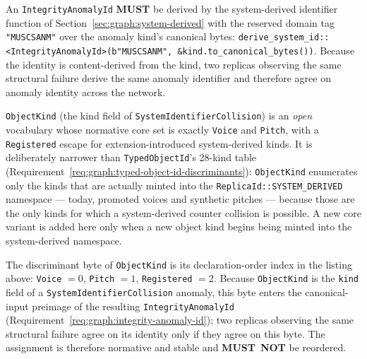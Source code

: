 \documentclass[11pt,letterpaper]{report}
\newcounter{requirement}[chapter]
\newcommand{\MUST}{\textbf{MUST}}
\newcommand{\MUSTNOT}{\textbf{MUST}\nobreak\ \textbf{NOT}}
\begin{document}
\begin{requirement}
  \label{req:graph:integrity-anomaly-id}
  An \texttt{IntegrityAnomalyId} \MUST{} be derived by the
  system-derived identifier function of
  Section~\ref{sec:graph:system-derived} with the reserved domain tag
  \texttt{"MUSCSANM"} over the anomaly kind's canonical bytes:
  \texttt{derive\_system\_id::<IntegrityAnomalyId>(b"MUSCSANM",
  \&kind.to\_canonical\_bytes())}. Because the identity is content-derived
  from the kind, two replicas observing the same structural failure
  derive the same anomaly identifier and therefore agree on anomaly
  identity across the network.
\end{requirement}

\begin{requirement}
  \label{req:graph:object-kind-vocab}
  \texttt{ObjectKind} (the kind field of
  \texttt{SystemIdentifierCollision}) is an \emph{open} vocabulary
  whose normative core set is exactly \texttt{Voice} and
  \texttt{Pitch}, with a \texttt{Registered} escape for
  extension-introduced system-derived kinds. It is deliberately
  narrower than \texttt{TypedObjectId}'s 28-kind table
  (Requirement~\ref{req:graph:typed-object-id-discriminants}):
  \texttt{ObjectKind} enumerates only the kinds that are actually
  minted into the \texttt{ReplicaId::SYSTEM\_DERIVED} namespace ---
  today, promoted voices and synthetic pitches --- because those are
  the only kinds for which a system-derived counter collision is
  possible. A new core variant is added here only when a new object
  kind begins being minted into the system-derived namespace.

  The discriminant byte of \texttt{ObjectKind} is its declaration-order
  index in the listing above: \texttt{Voice} $= 0$, \texttt{Pitch}
  $= 1$, \texttt{Registered} $= 2$. Because \texttt{ObjectKind} is the
  \texttt{kind} field of a \texttt{SystemIdentifierCollision} anomaly,
  this byte enters the canonical-input preimage of the resulting
  \texttt{IntegrityAnomalyId}
  (Requirement~\ref{req:graph:integrity-anomaly-id}); two replicas
  observing the same structural failure agree on its identity only if
  they agree on this byte. The assignment is therefore normative and
  stable and \MUSTNOT{} be reordered.
\end{requirement}
\end{document}
